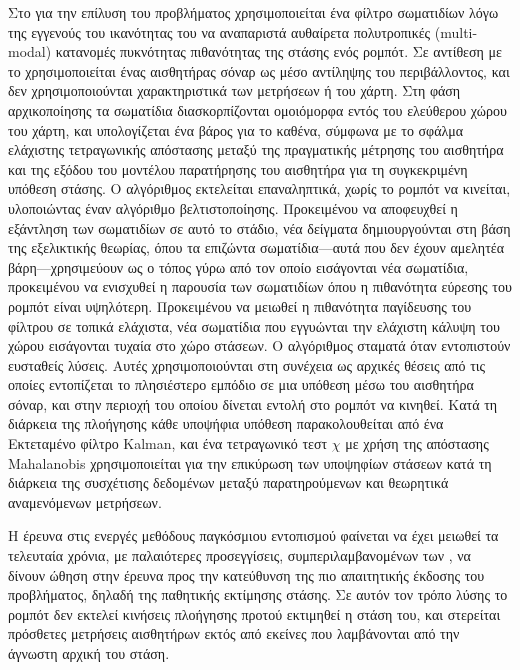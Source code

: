 Στο \cite{Gasparri2007a} για την επίλυση του προβλήματος χρησιμοποιείται ένα
φίλτρο σωματιδίων λόγω της εγγενούς του ικανότητας του να αναπαριστά αυθαίρετα
πολυτροπικές (multi-modal) κατανομές πυκνότητας πιθανότητας της στάσης ενός
ρομπότ. Σε αντίθεση με το \cite{Jensfelt2001a} χρησιμοποιείται ένας αισθητήρας
σόναρ ως μέσο αντίληψης του περιβάλλοντος, και δεν χρησιμοποιούνται
χαρακτηριστικά των μετρήσεων ή του χάρτη.  Στη φάση αρχικοποίησης τα σωματίδια
διασκορπίζονται ομοιόμορφα εντός του ελεύθερου χώρου του χάρτη, και
υπολογίζεται ένα βάρος για το καθένα, σύμφωνα με το σφάλμα ελάχιστης
τετραγωνικής απόστασης μεταξύ της πραγματικής μέτρησης του αισθητήρα και της
εξόδου του μοντέλου παρατήρησης του αισθητήρα για τη συγκεκριμένη υπόθεση
στάσης. Ο αλγόριθμος εκτελείται επαναληπτικά, χωρίς το ρομπότ να κινείται,
υλοποιώντας έναν αλγόριθμο βελτιστοποίησης. Προκειμένου να αποφευχθεί η
εξάντληση των σωματιδίων σε αυτό το στάδιο, νέα δείγματα δημιουργούνται στη
βάση της εξελικτικής θεωρίας, όπου τα επιζώντα σωματίδια---αυτά που δεν έχουν
αμελητέα βάρη---χρησιμεύουν ως ο τόπος γύρω από τον οποίο εισάγονται νέα
σωματίδια, προκειμένου να ενισχυθεί η παρουσία των σωματιδίων όπου η πιθανότητα
εύρεσης του ρομπότ είναι υψηλότερη. Προκειμένου να μειωθεί η πιθανότητα
παγίδευσης του φίλτρου σε τοπικά ελάχιστα, νέα σωματίδια που εγγυώνται την
ελάχιστη κάλυψη του χώρου εισάγονται τυχαία στο χώρο στάσεων. Ο αλγόριθμος
σταματά όταν εντοπιστούν ευσταθείς λύσεις. Αυτές χρησιμοποιούνται στη συνέχεια
ως αρχικές θέσεις από τις οποίες εντοπίζεται το πλησιέστερο εμπόδιο σε μια
υπόθεση μέσω του αισθητήρα σόναρ, και στην περιοχή του οποίου δίνεται εντολή
στο ρομπότ να κινηθεί. Κατά τη διάρκεια της πλοήγησης κάθε υποψήφια υπόθεση
παρακολουθείται από ένα Εκτεταμένο φίλτρο Kalman, και ένα τετραγωνικό τεστ
$\chi$ με χρήση της απόστασης Mahalanobis χρησιμοποιείται για την επικύρωση των
υποψηφίων στάσεων κατά τη διάρκεια της συσχέτισης δεδομένων μεταξύ
παρατηρούμενων και θεωρητικά αναμενόμενων μετρήσεων.

Η έρευνα στις ενεργές μεθόδους παγκόσμιου εντοπισμού φαίνεται να έχει μειωθεί
τα τελευταία χρόνια, με παλαιότερες προσεγγίσεις, συμπεριλαμβανομένων των
\cite{Manasse1988,Kleinberg,Romanik1996,Dudek1998,OKanea,Rao2007}, να δίνουν
ώθηση στην έρευνα προς την κατεύθυνση της πιο απαιτητικής έκδοσης του
προβλήματος, δηλαδή της παθητικής εκτίμησης στάσης. Σε αυτόν τον τρόπο
λύσης το ρομπότ δεν εκτελεί κινήσεις πλοήγησης προτού εκτιμηθεί η στάση του,
και στερείται πρόσθετες μετρήσεις αισθητήρων εκτός από εκείνες που λαμβάνονται
από την άγνωστη αρχική του στάση.

